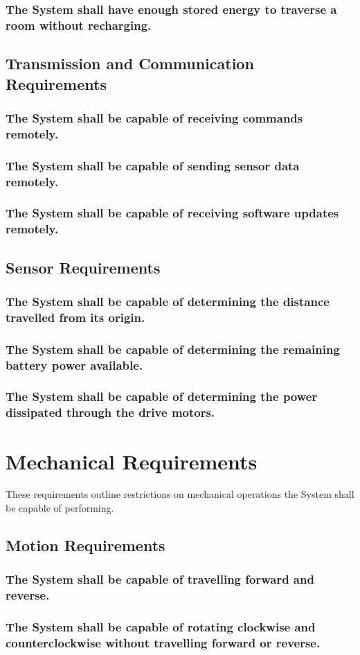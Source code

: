 \documentclass[12pt]{article}
\begin{document}
\subsubsection{The System shall have enough stored energy to traverse a room without recharging.}

\subsection{Transmission and Communication Requirements}
\subsubsection{The System shall be capable of receiving commands remotely.}
\subsubsection{The System shall be capable of sending sensor data remotely.}
\subsubsection{The System shall be capable of receiving software updates remotely.}

\subsection{Sensor Requirements}
\subsubsection{The System shall be capable of determining the distance travelled from its origin.}
\subsubsection{The System shall be capable of determining the remaining battery power available.}
\subsubsection{The System shall be capable of determining the power dissipated through the drive motors.}

\section{Mechanical Requirements}
These requirements outline restrictions on mechanical operations the System shall be capable of performing.

\subsection{Motion Requirements}
\subsubsection{The System shall be capable of travelling forward and reverse.}
\subsubsection{The System shall be capable of rotating clockwise and counterclockwise without travelling forward or reverse.}
\end{document}
